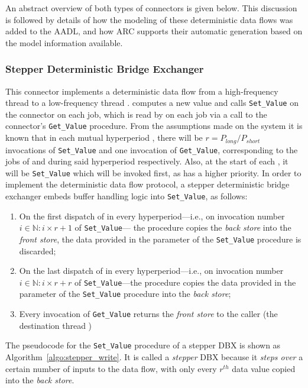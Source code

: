 An abstract overview of both types of connectors is given below. This
discussion is followed by details of how the modeling of these
deterministic data flows was added to the AADL, and how ARC supports
their automatic generation based on the model information available.

\subsubsection{Stepper Deterministic Bridge Exchanger}
This connector implements a deterministic data flow from a
high-frequency thread \ts to a low-frequency thread \tl. \ts computes
a new value and calls \texttt{Set\_Value} on the connector on each
job, which is read by \tl on each job via a call to the connector's
\texttt{Get\_Value} procedure. From the assumptions made on the system
it is known that in each mutual hyperperiod \plong, there will be
$r=P_{long}/P_{short}$ invocations of \texttt{Set\_Value} and one
invocation of \texttt{Get\_Value}, corresponding to the jobs of \ts
and \tl during said hyperperiod respectively. Also, at the start of
each \plong, it will be \texttt{Set\_Value} which will be invoked
first, as \ts has a higher priority. In order to implement the
deterministic data flow protocol, a stepper deterministic bridge
exchanger embeds buffer handling logic into \texttt{Set\_Value}, as
follows:

\begin{enumerate}
\item{On the first dispatch of \ts in every hyperperiod---i.e., on
  invocation number $i\in\mathbb{N}:i\times r+1$ of
  \texttt{Set\_Value}--- the procedure copies the \emph{back store}
  into the \emph{front store}, the data provided in the parameter of
  the \texttt{Set\_Value} procedure is discarded;}
\item{On the last dispatch of \ts in every hyperperiod---i.e., on
  invocation number $i\in\mathbb{N}:i\times r+r$ of
  \texttt{Set\_Value}---the procedure copies the data provided in the
  parameter of the \texttt{Set\_Value} procedure into the \emph{back
    store};}
\item{Every invocation of \texttt{Get\_Value} returns the \emph{front
    store} to the caller (the destination thread \tl)}
\end{enumerate}

The pseudocode for the \texttt{Set\_Value} procedure of a stepper DBX
is shown as Algorithm~\ref{algo:stepper_write}. It is called a
\emph{stepper} DBX because it \emph{steps over} a certain number of
inputs to the data flow, with only every $r^{th}$ data value copied
into the \emph{back store}.

